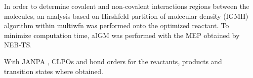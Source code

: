 In order to determine covalent and non-covalent interactions regions between the molecules, an analysis based on Hirshfeld partition of molecular density (IGMH) algorithm within multiwfn was performed \cite{Lu2021} onto the optimized reactant. To minimize computation time, aIGM was performed with the MEP obtained by NEB-TS.

With JANPA \cite{Nikolaienko2014}, CLPOs and bond orders for the reactants, products and transition states where obtained.